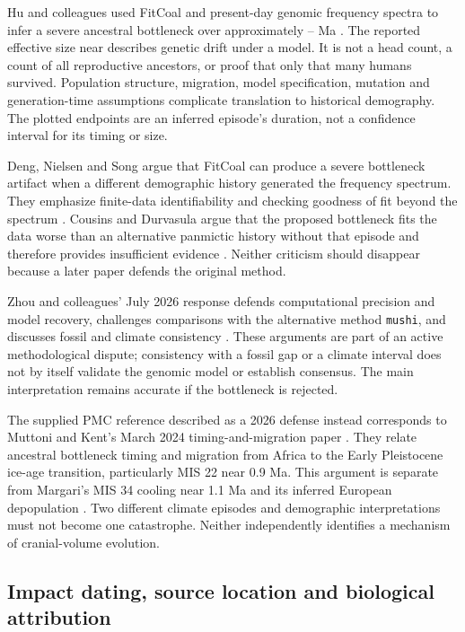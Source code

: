 Hu and colleagues used FitCoal and present-day genomic frequency spectra to infer a severe ancestral bottleneck over approximately \MwcBottleneckOlder--\MwcBottleneckYounger{} Ma \citep{hu2023}. The reported effective size near \MwcEffectiveSize{} describes genetic drift under a model. It is not a head count, a count of all reproductive ancestors, or proof that only that many humans survived. Population structure, migration, model specification, mutation and generation-time assumptions complicate translation to historical demography. The plotted endpoints are an inferred episode's duration, not a confidence interval for its timing or size.

Deng, Nielsen and Song argue that FitCoal can produce a severe bottleneck artifact when a different demographic history generated the frequency spectrum. They emphasize finite-data identifiability and checking goodness of fit beyond the spectrum \citep{deng2025}. Cousins and Durvasula argue that the proposed bottleneck fits the data worse than an alternative panmictic history without that episode and therefore provides insufficient evidence \citep{cousins2025}. Neither criticism should disappear because a later paper defends the original method.

Zhou and colleagues' July 2026 response defends computational precision and model recovery, challenges comparisons with the alternative method \texttt{mushi}, and discusses fossil and climate consistency \citep{zhou2026}. These arguments are part of an active methodological dispute; consistency with a fossil gap or a climate interval does not by itself validate the genomic model or establish consensus. The main interpretation remains accurate if the bottleneck is rejected.

The supplied PMC reference described as a 2026 defense instead corresponds to Muttoni and Kent's March 2024 timing-and-migration paper \citep{muttoni2024}. They relate ancestral bottleneck timing and migration from Africa to the Early Pleistocene ice-age transition, particularly MIS 22 near 0.9 Ma. This argument is separate from Margari's MIS 34 cooling near 1.1 Ma and its inferred European depopulation \citep{margari2023}. Two different climate episodes and demographic interpretations must not become one catastrophe. Neither independently identifies a mechanism of cranial-volume evolution.

\subsection{Impact dating, source location and biological attribution}

